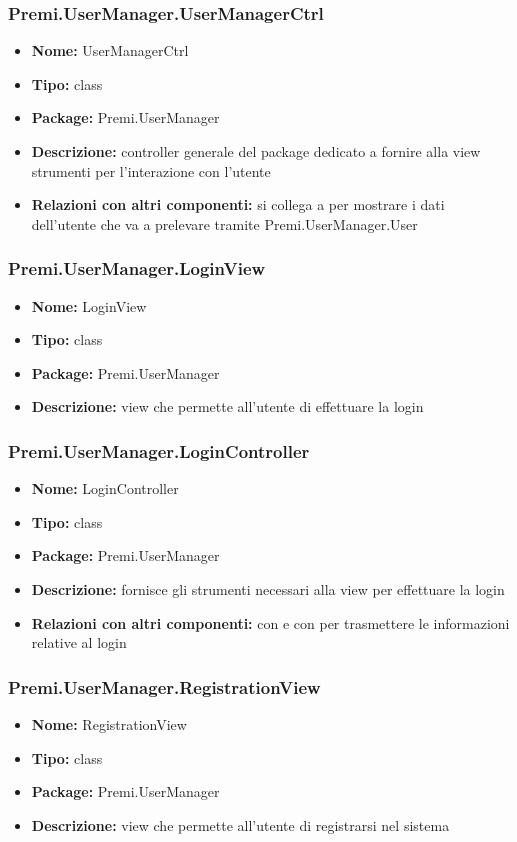 \subsubsection{Premi.UserManager.UserManagerCtrl}
\begin{itemize}
  \item \textbf{Nome:} UserManagerCtrl
  \item \textbf{Tipo:} class
  \item \textbf{Package:} Premi.UserManager
  \item \textbf{Descrizione:} controller generale del package  dedicato a fornire alla view strumenti per l'interazione con l'utente
  \item \textbf{Relazioni con altri componenti:} si collega a  per mostrare i dati dell'utente che va a prelevare tramite {Premi.UserManager.User}
\end{itemize}
\subsubsection{Premi.UserManager.LoginView}
\begin{itemize}
  \item \textbf{Nome:} LoginView
  \item \textbf{Tipo:} class
  \item \textbf{Package:} Premi.UserManager
  \item \textbf{Descrizione:} view che permette all'utente di effettuare la login
\end{itemize}
\subsubsection{Premi.UserManager.LoginController}
\begin{itemize}
  \item \textbf{Nome:} LoginController
  \item \textbf{Tipo:} class
  \item \textbf{Package:} Premi.UserManager
  \item \textbf{Descrizione:} fornisce gli strumenti necessari alla view per effettuare la login
  \item \textbf{Relazioni con altri componenti:} con  e con  per trasmettere le informazioni relative al login
\end{itemize}
\subsubsection{Premi.UserManager.RegistrationView}
\begin{itemize}
  \item \textbf{Nome:} RegistrationView
  \item \textbf{Tipo:} class
  \item \textbf{Package:} Premi.UserManager
  \item \textbf{Descrizione:} view che permette all'utente di registrarsi nel sistema
\end{itemize}
